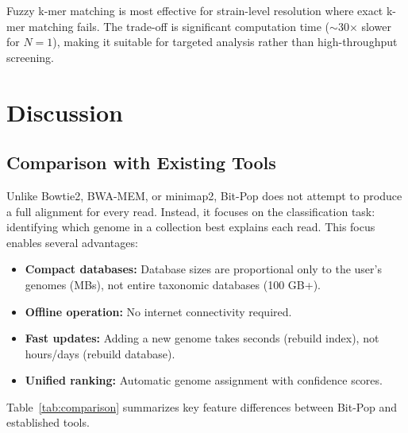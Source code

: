 \documentclass{article}
\begin{document}
Fuzzy k-mer matching is most effective for strain-level resolution where exact k-mer matching fails. The trade-off is significant computation time ($\sim$30$\times$ slower for $N=1$), making it suitable for targeted analysis rather than high-throughput screening.

\section{Discussion}

\subsection{Comparison with Existing Tools}

Unlike Bowtie2, BWA-MEM, or minimap2, Bit-Pop does not attempt to produce a full alignment for every read. Instead, it focuses on the classification task: identifying which genome in a collection best explains each read. This focus enables several advantages:

\begin{itemize}
    \item \textbf{Compact databases:} Database sizes are proportional only to the user's genomes (MBs), not entire taxonomic databases (100 GB+).
    \item \textbf{Offline operation:} No internet connectivity required.
    \item \textbf{Fast updates:} Adding a new genome takes seconds (rebuild index), not hours/days (rebuild database).
    \item \textbf{Unified ranking:} Automatic genome assignment with confidence scores.
\end{itemize}

Table~\ref{tab:comparison} summarizes key feature differences between Bit-Pop and established tools.
\end{document}
